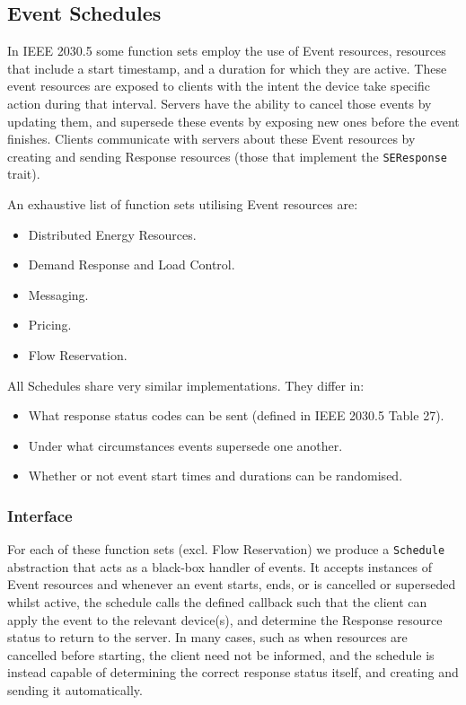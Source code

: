 \subsection{Event Schedules}
In IEEE 2030.5 some function sets employ the use of Event resources, resources that include a start timestamp, and a duration for which they are active. These event resources are exposed to clients with the intent the device take specific action during that interval. Servers have the ability to cancel those events by updating them, and supersede these events by exposing new ones before the event finishes. Clients communicate with servers about these Event resources by creating and sending Response resources (those that implement the \texttt{SEResponse} trait).

An exhaustive list of function sets utilising Event resources are:

\begin{itemize}
    \item Distributed Energy Resources.
    \item Demand Response and Load Control.
    \item Messaging.
    \item Pricing.
    \item Flow Reservation.
\end{itemize}

All Schedules share very similar implementations. They differ in:

\begin{itemize}
    \item What response status codes can be sent (defined in IEEE 2030.5 Table 27).
    \item Under what circumstances events supersede one another.
    \item Whether or not event start times and durations can be randomised.
\end{itemize}

\subsubsection{Interface}

For each of these function sets (excl. Flow Reservation) we produce a \texttt{Schedule} abstraction that acts as a black-box handler of events. It accepts instances of Event resources and whenever an event starts, ends, or is cancelled or superseded whilst active, the schedule calls the defined callback such that the client can apply the event to the relevant device(s), and determine the Response resource status to return to the server. In many cases, such as when resources are cancelled before starting, the client need not be informed, and the schedule is instead capable of determining the correct response status itself, and creating and sending it automatically.

